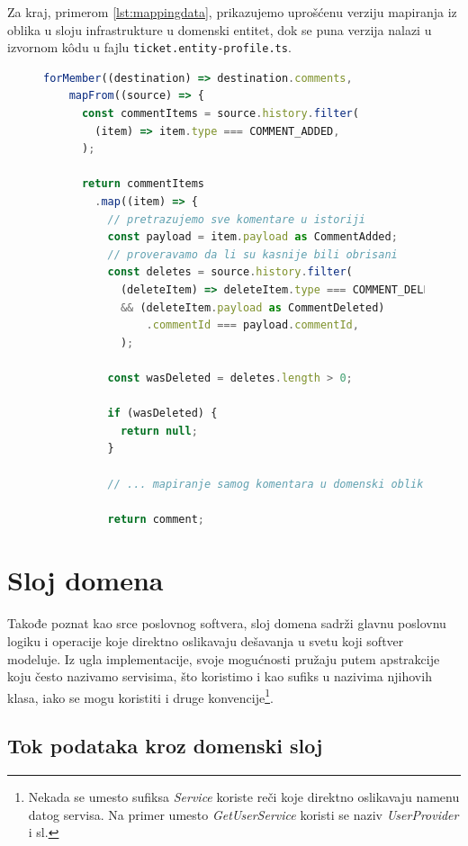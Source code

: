 \documentclass[12pt,oneside]{memoir}
\begin{document}
\newpage
Za kraj, primerom \ref{lst:mappingdata}, prikazujemo uprošćenu verziju mapiranja iz oblika u sloju infrastrukture u domenski entitet, dok se puna verzija nalazi u izvornom k\^{o}du u fajlu \verb|ticket.entity-profile.ts|.

\begin{figure}[h]
\begin{lstlisting}[language=JavaScript, style=ES6, caption={Mapiranje komentara tiketa.}, label={lst:mappingdata}]
  forMember((destination) => destination.comments,
    mapFrom((source) => {
      const commentItems = source.history.filter(
        (item) => item.type === COMMENT_ADDED,
      );

      return commentItems
        .map((item) => {
          // pretrazujemo sve komentare u istoriji
          const payload = item.payload as CommentAdded;
          // proveravamo da li su kasnije bili obrisani
          const deletes = source.history.filter(
            (deleteItem) => deleteItem.type === COMMENT_DELETED 
            && (deleteItem.payload as CommentDeleted)
                .commentId === payload.commentId,
            );
          
          const wasDeleted = deletes.length > 0;

          if (wasDeleted) {
            return null;
          }

          // ... mapiranje samog komentara u domenski oblik...

          return comment;

\end{lstlisting}
\end{figure}



\newpage
\section{Sloj domena}

Takođe poznat kao srce poslovnog softvera, sloj domena sadrži glavnu poslovnu logiku i operacije koje direktno oslikavaju dešavanja u svetu koji softver modeluje. Iz ugla implementacije, svoje mogućnosti pružaju putem apstrakcije koju često nazivamo servisima, što koristimo i kao sufiks u nazivima njihovih klasa, iako se mogu koristiti i druge konvencije\footnote{Nekada se umesto sufiksa \textit{Service} koriste reči koje direktno oslikavaju namenu datog servisa. Na primer umesto \textit{GetUserService} koristi se naziv \textit{UserProvider} i sl.}.

\subsection{Tok podataka kroz domenski sloj}
\end{document}
